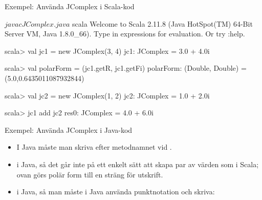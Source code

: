 \begin{Slide}{Exempel: Använda JComplex i Scala-kod}
\begin{REPL}
$ javac JComplex.java
$ scala
Welcome to Scala 2.11.8 (Java HotSpot(TM) 64-Bit Server VM, Java 1.8.0_66).
Type in expressions for evaluation. Or try :help.

scala> val jc1 = new JComplex(3, 4)
jc1: JComplex = 3.0 + 4.0i

scala> val polarForm = (jc1.getR, jc1.getFi)
polarForm: (Double, Double) = (5.0,0.6435011087932844)

scala> val jc2 = new JComplex(1, 2)
jc2: JComplex = 1.0 + 2.0i

scala> jc1 add jc2
res0: JComplex = 4.0 + 6.0i
\end{REPL}
\end{Slide}




\begin{Slide}{Exempel: Använda JComplex i Java-kod}\SlideFontSmall
{}
\begin{itemize}
\item I Java måste man skriva  efter metodnamnet vid .

\item {} i Java, så det går inte på ett enkelt sätt att skapa par av värden som i Scala; ovan görs polär form till en sträng för utskrift.

\item {} i Java, så man måste i Java använda punktnotation och skriva: 
\end{itemize}
\end{Slide}










